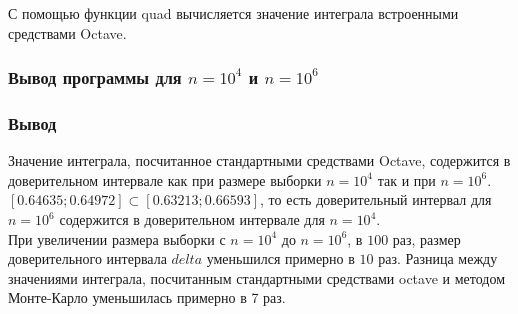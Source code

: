 \documentclass{article}
\begin{document}
	
	С помощью функции quad вычисляется значение интеграла встроенными средствами Octave.
	\subsubsection{Вывод программы для $n = 10 ^ 4$ и $n = 10 ^ 6$}
	\begin{minipage}{\linewidth}
		
		
	\end{minipage}
	\subsubsection{Вывод}
	Значение  интеграла, посчитанное стандартными средствами Octave, содержится в доверительном интервале как при размере выборки $n = 10^4$ так и при $n = 10^6$. \\
	$[0.64635; 0.64972] \subset [0.63213; 0.66593]$, то есть доверительный интервал для $n = 10^6$ содержится в доверительном интервале для $n = 10^4$. \\
	При увеличении размера выборки с $n = 10 ^ 4$ до $n = 10 ^ 6$, в $100$ раз, размер доверительного интервала $delta$ уменьшился примерно в $10$ раз. Разница между значениями интеграла, посчитанным стандартными средствами octave и методом Монте-Карло уменьшилась примерно в 7 раз.
\end{document}
